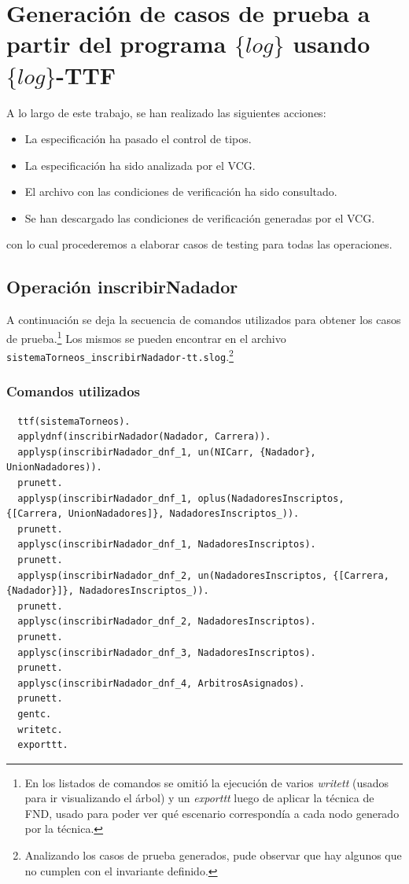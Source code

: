 \documentclass{article}
\begin{document}
\section*{Generación de casos de prueba a partir del programa $\{log\}$ usando $\{log\}$-TTF}

A lo largo de este trabajo, se han realizado las siguientes acciones:
\begin{itemize}
  \item La especificación ha pasado el control de tipos.
  \item La especificación ha sido analizada por el VCG.
  \item El archivo con las condiciones de verificación ha sido consultado.
  \item Se han descargado las condiciones de verificación generadas por el VCG.
\end{itemize}

con lo cual procederemos a elaborar casos de testing para todas las operaciones.

\subsection*{Operación inscribirNadador}
A continuación se deja la secuencia de comandos utilizados para obtener los casos de prueba.\footnote{En los listados de comandos se omitió la ejecución de varios \textit{writett} (usados para ir 
visualizando el árbol) y un \textit{exporttt} luego de aplicar la técnica de FND, usado para poder ver qué escenario
correspondía a cada nodo generado por la técnica.} Los mismos se pueden encontrar en el archivo \verb|sistemaTorneos_inscribirNadador-tt.slog|.\footnote{Analizando
los casos de prueba generados, pude observar que hay algunos que no cumplen con el invariante definido.}

\subsubsection*{Comandos utilizados}

\begin{footnotesize}
\begin{verbatim}
  ttf(sistemaTorneos).
  applydnf(inscribirNadador(Nadador, Carrera)).
  applysp(inscribirNadador_dnf_1, un(NICarr, {Nadador}, UnionNadadores)).
  prunett.
  applysp(inscribirNadador_dnf_1, oplus(NadadoresInscriptos, {[Carrera, UnionNadadores]}, NadadoresInscriptos_)).
  prunett.
  applysc(inscribirNadador_dnf_1, NadadoresInscriptos).
  prunett.
  applysp(inscribirNadador_dnf_2, un(NadadoresInscriptos, {[Carrera, {Nadador}]}, NadadoresInscriptos_)).
  prunett.
  applysc(inscribirNadador_dnf_2, NadadoresInscriptos).
  prunett.
  applysc(inscribirNadador_dnf_3, NadadoresInscriptos).
  prunett.
  applysc(inscribirNadador_dnf_4, ArbitrosAsignados).
  prunett.
  gentc.
  writetc.
  exporttt.
\end{verbatim}
\end{footnotesize}
\end{document}
